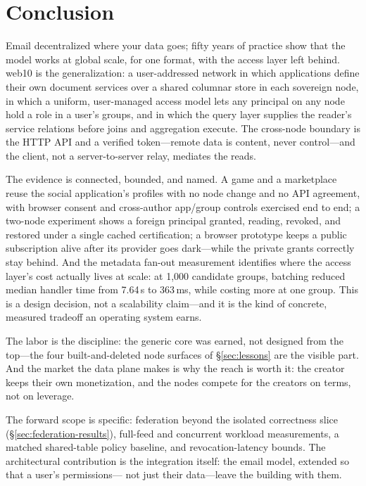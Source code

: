 \documentclass[sigconf, nonacm]{acmart}
\begin{document}
\section{Conclusion}
\label{sec:concl}

Email decentralized where your data goes; fifty years of practice show that
the model works at global scale, for one format, with the access layer left
behind. web10 is the generalization: a user-addressed network in which
applications define their own document services over a shared columnar store
in each sovereign node, in which a uniform, user-managed access model lets
any principal on any node hold a role in a user's groups, and in which the
query layer supplies the reader's service relations before joins and
aggregation execute. The cross-node boundary is the HTTP API and a verified
token---remote data is content, never control---and the client, not a
server-to-server relay, mediates the reads.

The evidence is connected, bounded, and named. A game and a marketplace
reuse the social application's profiles with no node change and no API
agreement, with browser consent and cross-author app/group controls
exercised end to end; a two-node experiment shows a foreign principal
granted, reading, revoked, and restored under a single cached
certification; a browser prototype keeps a public subscription alive after
its provider goes dark---while the private grants correctly stay behind.
And the metadata fan-out measurement identifies where the access layer's
cost actually lives at scale: at 1,000 candidate groups, batching reduced
median handler time from 7.64\,s to 363\,ms, while costing more at one
group. This is a design decision, not a scalability claim---and it is the
kind of concrete, measured tradeoff an operating system earns.

The labor is the discipline: the generic core was earned, not designed from
the top---the four built-and-deleted node surfaces of \S\ref{sec:lessons}
are the visible part. And
the market the data plane makes is why the reach is worth it: the creator
keeps their own monetization, and the nodes compete for the creators on
terms, not on leverage.

The forward scope is specific: federation beyond the isolated correctness
slice (\S\ref{sec:federation-results}), full-feed and concurrent workload
measurements, a matched shared-table policy baseline, and
revocation-latency bounds. The architectural contribution is the
integration itself: the email model, extended so that a user's permissions---
not just their data---leave the building with them.



\end{document}

